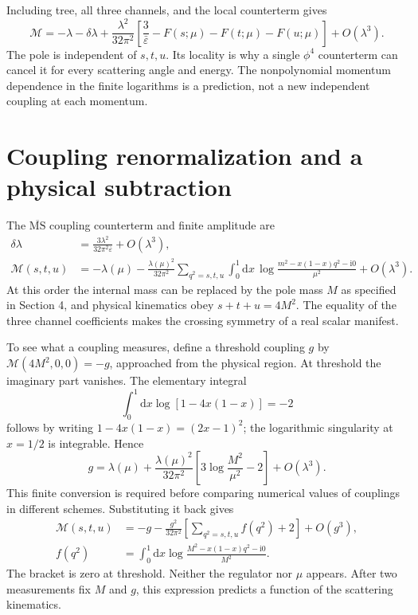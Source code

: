 \documentclass[11pt]{article}
\newcommand{\dd}{\mathrm d}
\newcommand{\ii}{\mathrm i}
\newcommand{\eps}{\varepsilon}
\newcommand{\MSbar}{\overline{\mathrm{MS}}}
\newcommand{\module}[1]{\clearpage\section{#1}}
\begin{document}
Including tree, all three channels, and the local counterterm gives
\begin{equation}
 \mathcal M=-\lambda-\delta\lambda+
 \frac{\lambda^2}{32\pi^2}
 \left[\frac3{\bar\eps}-F(s;\mu)-F(t;\mu)-F(u;\mu)\right]
 +O(\lambda^3).                                  \label{eq:beforect}
\end{equation}
The pole is independent of \(s,t,u\). Its locality is why a single
\(\phi^4\) counterterm can cancel it for every scattering angle and
energy. The nonpolynomial momentum dependence in the finite logarithms
is a prediction, not a new independent coupling at each momentum.

\module{Coupling renormalization and a physical subtraction}
The \(\MSbar\) coupling counterterm and finite amplitude are
\begin{align}
 \delta\lambda&=\frac{3\lambda^2}{32\pi^2\bar\eps}+O(\lambda^3),
 \label{eq:deltalambda}\\
 \mathcal M(s,t,u)&=-\lambda(\mu)
 -\frac{\lambda(\mu)^2}{32\pi^2}
 \sum_{q^2=s,t,u}\int_0^1\dd x\,
 \log\frac{m^2-x(1-x)q^2-\ii0}{\mu^2}+O(\lambda^3).
 \label{eq:MSamplitude}
\end{align}
At this order the internal mass can be replaced by the pole mass
\(M\) as specified in Section 4, and physical kinematics obey
\(s+t+u=4M^2\). The equality of the three channel coefficients
makes the crossing symmetry of a real scalar manifest.

To see what a coupling measures, define a threshold coupling \(g\)
by \(\mathcal M(4M^2,0,0)=-g\), approached from the physical region.
At threshold the imaginary part vanishes. The elementary integral
\begin{equation}
 \int_0^1\dd x\log[1-4x(1-x)]=-2
\end{equation}
follows by writing \(1-4x(1-x)=(2x-1)^2\); the logarithmic singularity
at \(x=1/2\) is integrable. Hence
\begin{equation}
 g=\lambda(\mu)+\frac{\lambda(\mu)^2}{32\pi^2}
 \left[3\log\frac{M^2}{\mu^2}-2\right]+O(\lambda^3).
 \label{eq:matching}
\end{equation}
This finite conversion is required before comparing numerical values
of couplings in different schemes. Substituting it back gives
\begin{equation}
 \begin{aligned}
 \mathcal M(s,t,u)&=-g-\frac{g^2}{32\pi^2}
 \left[\sum_{q^2=s,t,u}f(q^2)+2\right]+O(g^3),\\
 f(q^2)&=\int_0^1\dd x\log\frac{M^2-x(1-x)q^2-\ii0}{M^2}.
 \end{aligned}
 \label{eq:thresholdamplitude}
\end{equation}
The bracket is zero at threshold. Neither the regulator nor \(\mu\)
appears. After two measurements fix \(M\) and \(g\), this expression
predicts a function of the scattering kinematics.
\end{document}
